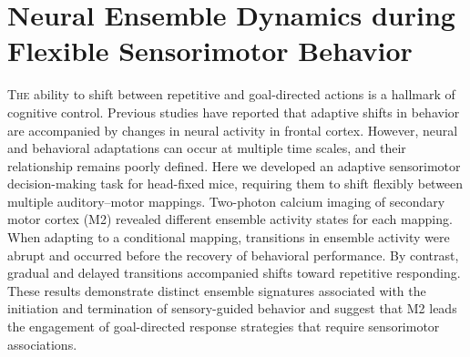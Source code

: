 \chapter{Neural Ensemble Dynamics during Flexible Sensorimotor Behavior}
\label{NN_paper}


\lettrine[lines=3]{T}{he} ability to shift between repetitive and goal-directed actions is a hallmark of cognitive control. Previous studies have reported that adaptive shifts in behavior are accompanied by changes in neural activity in frontal cortex. However, neural and behavioral adaptations can occur at multiple time scales, and their relationship remains poorly defined. Here we developed an adaptive sensorimotor decision-making task for head-fixed mice, requiring them to shift flexibly between multiple auditory–motor mappings. Two-photon calcium imaging of secondary motor cortex (M2) revealed different ensemble activity states for each mapping. When adapting to a conditional mapping, transitions in ensemble activity were abrupt and occurred before the recovery of behavioral performance. By contrast, gradual and delayed transitions accompanied shifts toward repetitive responding. These results demonstrate distinct ensemble signatures associated with the initiation and termination of sensory-guided behavior and suggest that M2 leads the engagement of goal-directed response strategies that require sensorimotor associations.
\newpage












